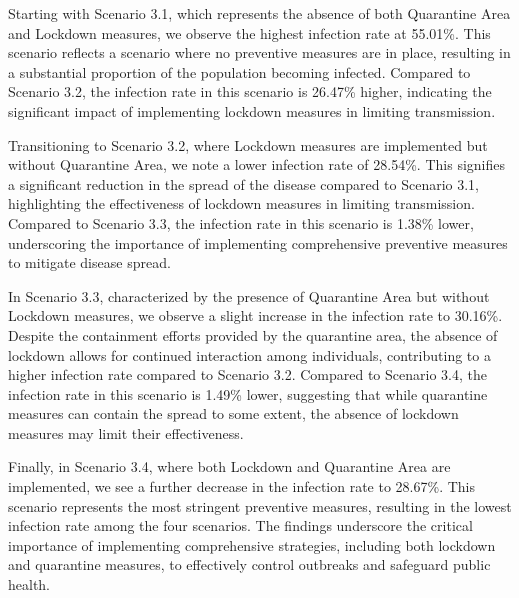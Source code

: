 Starting with Scenario 3.1, which represents the absence of both Quarantine Area and Lockdown measures, we observe the highest infection rate at 55.01\%. This scenario reflects a scenario where no preventive measures are in place, resulting in a substantial proportion of the population becoming infected. Compared to Scenario 3.2, the infection rate in this scenario is 26.47\% higher, indicating the significant impact of implementing lockdown measures in limiting transmission.

Transitioning to Scenario 3.2, where Lockdown measures are implemented but without Quarantine Area, we note a lower infection rate of 28.54\%. This signifies a significant reduction in the spread of the disease compared to Scenario 3.1, highlighting the effectiveness of lockdown measures in limiting transmission. Compared to Scenario 3.3, the infection rate in this scenario is 1.38\% lower, underscoring the importance of implementing comprehensive preventive measures to mitigate disease spread.

In Scenario 3.3, characterized by the presence of Quarantine Area but without Lockdown measures, we observe a slight increase in the infection rate to 30.16\%. Despite the containment efforts provided by the quarantine area, the absence of lockdown allows for continued interaction among individuals, contributing to a higher infection rate compared to Scenario 3.2. Compared to Scenario 3.4, the infection rate in this scenario is 1.49\% lower, suggesting that while quarantine measures can contain the spread to some extent, the absence of lockdown measures may limit their effectiveness.

Finally, in Scenario 3.4, where both Lockdown and Quarantine Area are implemented, we see a further decrease in the infection rate to 28.67\%. This scenario represents the most stringent preventive measures, resulting in the lowest infection rate among the four scenarios. The findings underscore the critical importance of implementing comprehensive strategies, including both lockdown and quarantine measures, to effectively control outbreaks and safeguard public health.


